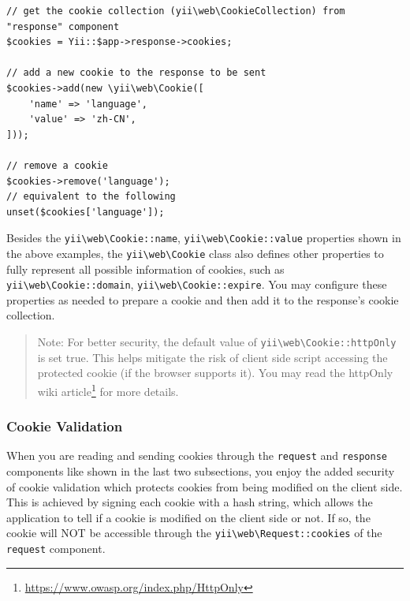 \lstset{language=php}\begin{lstlisting}
// get the cookie collection (yii\web\CookieCollection) from "response" component
$cookies = Yii::$app->response->cookies;

// add a new cookie to the response to be sent
$cookies->add(new \yii\web\Cookie([
    'name' => 'language',
    'value' => 'zh-CN',
]));

// remove a cookie
$cookies->remove('language');
// equivalent to the following
unset($cookies['language']);
\end{lstlisting}
Besides the \texttt{yii{\allowbreak{}\textbackslash}web{\allowbreak{}\textbackslash}Cookie\allowbreak{}::\allowbreak{}name}, \texttt{yii{\allowbreak{}\textbackslash}web{\allowbreak{}\textbackslash}Cookie\allowbreak{}::\allowbreak{}value} properties shown in the above
examples, the \texttt{yii{\allowbreak{}\textbackslash}web{\allowbreak{}\textbackslash}Cookie} class also defines other properties to fully represent all possible information
of cookies, such as \texttt{yii{\allowbreak{}\textbackslash}web{\allowbreak{}\textbackslash}Cookie\allowbreak{}::\allowbreak{}domain}, \texttt{yii{\allowbreak{}\textbackslash}web{\allowbreak{}\textbackslash}Cookie\allowbreak{}::\allowbreak{}expire}. You may configure these
properties as needed to prepare a cookie and then add it to the response's cookie collection.

\begin{quote}Note: For better security, the default value of \texttt{yii{\allowbreak{}\textbackslash}web{\allowbreak{}\textbackslash}Cookie\allowbreak{}::\allowbreak{}httpOnly} is set true. This helps mitigate
the risk of client side script accessing the protected cookie (if the browser supports it). You may read
the httpOnly wiki article\footnote{\url{https://www.owasp.org/index.php/HttpOnly}} for more details.

\end{quote}
\subsubsection{Cookie Validation \label{runtime-sessions-cookies.md::cookie-validation}}
When you are reading and sending cookies through the \lstinline|request| and \lstinline|response| components like shown in the last
two subsections, you enjoy the added security of cookie validation which protects cookies from being modified
on the client side. This is achieved by signing each cookie with a hash string, which allows the application to
tell if a cookie is modified on the client side or not. If so, the cookie will NOT be accessible through the
\texttt{yii{\allowbreak{}\textbackslash}web{\allowbreak{}\textbackslash}Request\allowbreak{}::\allowbreak{}cookies} of the \lstinline|request| component.

